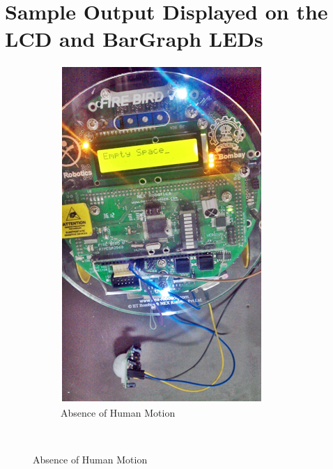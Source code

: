 \documentclass[a4paper,12 pt]{article}
\begin{document}
\section{Sample Output Displayed on the LCD and BarGraph LEDs}
\begin{figure}[h]
        \centering
        \begin{subfigure}[b]{0.45\textwidth}
                \includegraphics[width=\textwidth]{out1.png}
                \caption{Absence of Human Motion}
                \label{fig:9a}
        \end{subfigure}%
        ~ %

\end{figure}
\end{document}
